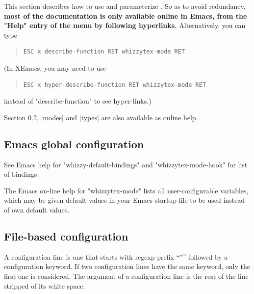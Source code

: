 \documentclass[12pt]{article}
\begin{document}
This section describes how to use and parameterize {\whizzy}.  So as to
avoid redundancy, {\bf most of the documentation is only available online in
Emacs, from the \lst"Help" entry of the menu by following hyperlinks.}
%
Alternatively, you can type
\begin{quote}
\begin{verbatim}
ESC x describe-function RET whizzytex-mode RET
\end{verbatim}
\end{quote}
(In XEmacs, you may need to use
\begin{quote}
\begin{verbatim}
ESC x hyper-describe-function RET whizzytex-mode RET
\end{verbatim}
\end{quote}
instead of \lst"describe-function" to see hyper-links.)

Section \ref{configuration}, \ref{modes} and
\ref{types} are also available as online help. 

\subsection {Emacs global configuration}

\label{configuration.viewers}
\label{configuration.bindings}
\label{Emacs-configuration}

See Emacs help for \lst"whizzy-default-bindings" and
\lst"whizzytex-mode-hook" for list of bindings.

The Emacs on-line help for \lst"whizzytex-mode" lists all user-configurable
variables,  which  may be given default values in your Emacs startup file
to be used instead of {\whizzy} own default values. 

\subsection {File-based configuration}

\label{configuration}
\label {File-configuration}


A configuration line is one that starts with regexp prefix ``\lst"^%
followed by a configuration keyword.  If two configuration lines have the same
keyword, only the first one is considered. The argument of a configuration
line is the rest of the line stripped of its white space.
\end{document}
